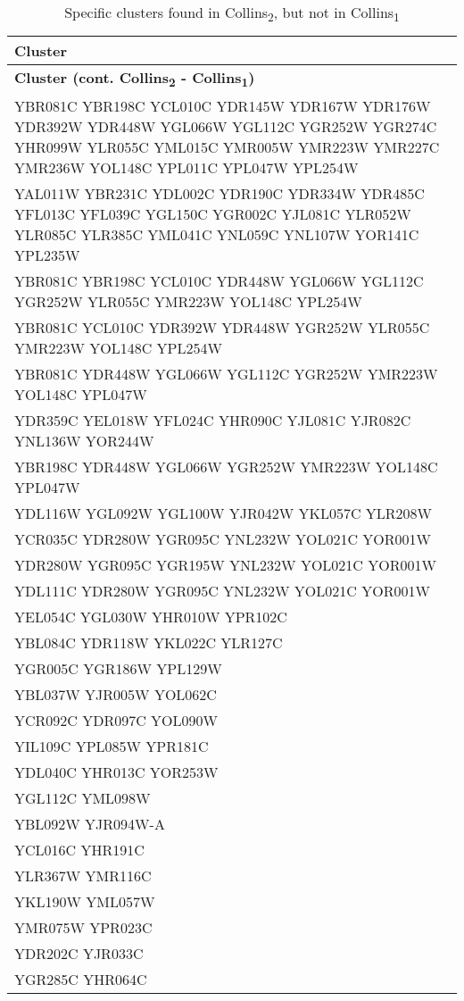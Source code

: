 \setlength{\extrarowheight}{2pt}
\renewcommand{\arraystretch}{1.2}
\begin{longtable}{| m{27em} |}
\caption{Specific clusters found in Collins\textsubscript{2}, but not in Collins\textsubscript{1}} \\
\hline
\textbf{Cluster} \\
\hline
\endfirsthead
\hline
\textbf{Cluster (cont. Collins\textsubscript{2} - Collins\textsubscript{1})} \\
\hline
\endhead
\hline
\endfoot
\hline
\endlastfoot
YBR081C YBR198C YCL010C YDR145W YDR167W YDR176W YDR392W YDR448W YGL066W YGL112C YGR252W YGR274C YHR099W YLR055C YML015C YMR005W YMR223W YMR227C YMR236W YOL148C YPL011C YPL047W YPL254W \\
\hline
YAL011W YBR231C YDL002C YDR190C YDR334W YDR485C YFL013C YFL039C YGL150C YGR002C YJL081C YLR052W YLR085C YLR385C YML041C YNL059C YNL107W YOR141C YPL235W \\
\hline
YBR081C YBR198C YCL010C YDR448W YGL066W YGL112C YGR252W YLR055C YMR223W YOL148C YPL254W \\
\hline
YBR081C YCL010C YDR392W YDR448W YGR252W YLR055C YMR223W YOL148C YPL254W \\
\hline
YBR081C YDR448W YGL066W YGL112C YGR252W YMR223W YOL148C YPL047W \\
\hline
YDR359C YEL018W YFL024C YHR090C YJL081C YJR082C YNL136W YOR244W \\
\hline
YBR198C YDR448W YGL066W YGR252W YMR223W YOL148C YPL047W \\
\hline
YDL116W YGL092W YGL100W YJR042W YKL057C YLR208W \\
\hline
YCR035C YDR280W YGR095C YNL232W YOL021C YOR001W \\
\hline
YDR280W YGR095C YGR195W YNL232W YOL021C YOR001W \\
\hline
YDL111C YDR280W YGR095C YNL232W YOL021C YOR001W \\
\hline
YEL054C YGL030W YHR010W YPR102C \\
\hline
YBL084C YDR118W YKL022C YLR127C \\
\hline
YGR005C YGR186W YPL129W \\
\hline
YBL037W YJR005W YOL062C \\
\hline
YCR092C YDR097C YOL090W \\
\hline
YIL109C YPL085W YPR181C \\
\hline
YDL040C YHR013C YOR253W \\
\hline
YGL112C YML098W \\
\hline
YBL092W YJR094W-A \\
\hline
YCL016C YHR191C \\
\hline
YLR367W YMR116C \\
\hline
YKL190W YML057W \\
\hline
YMR075W YPR023C \\
\hline
YDR202C YJR033C \\
\hline
YGR285C YHR064C \\
\hline
\end{longtable}